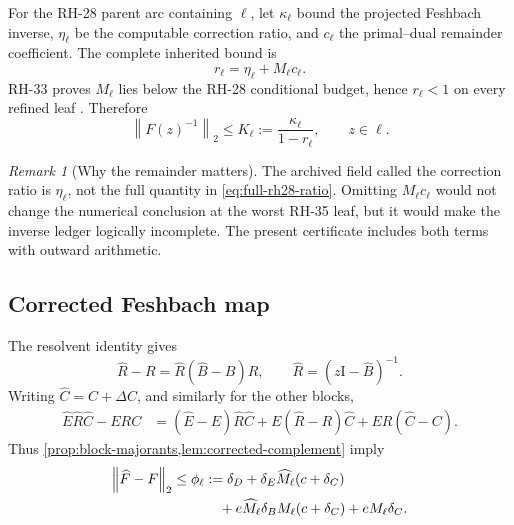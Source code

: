 \documentclass[11pt]{article}
\theoremstyle{definition}
\theoremstyle{remark}
\newtheorem{remark}[theorem]{Remark}
\newcommand{\Id}{\mathrm I}
\newcommand{\norm}[1]{\left\lVert#1\right\rVert}
\begin{document}
For the RH-28 parent arc containing \(\ell\), let
\(\kappa_\ell\) bound the projected Feshbach inverse,
\(\eta_\ell\) be the computable correction ratio, and \(c_\ell\) the
primal--dual remainder coefficient.  The complete inherited bound is
\begin{equation}
 r_\ell=\eta_\ell+M_\ell c_\ell.
 \label{eq:full-rh28-ratio}
\end{equation}
RH-33 proves \(M_\ell\) lies below the RH-28 conditional budget, hence
\(r_\ell<1\) on every refined leaf
\citep{WangArcwise2026,WangAtlas2026}.  Therefore
\begin{equation}
 \norm{F(z)^{-1}}_2
 \leq K_\ell:=
 \frac{\kappa_\ell}{1-r_\ell},
 \qquad z\in\ell.
 \label{eq:stored-f-inverse}
\end{equation}

\begin{remark}[Why the remainder matters]
\label{rem:full-remainder}
The archived field called the correction ratio is \(\eta_\ell\), not the
full quantity in \cref{eq:full-rh28-ratio}.  Omitting
\(M_\ell c_\ell\) would not change the numerical conclusion at the worst
RH-35 leaf, but it would make the inverse ledger logically incomplete.
The present certificate includes both terms with outward arithmetic.
\end{remark}

\subsection{Corrected Feshbach map}

The resolvent identity gives
\begin{equation}
 \widehat R-R
 =\widehat R(\widehat B-B)R,
 \qquad
 \widehat R=(z\Id-\widehat B)^{-1}.
 \label{eq:resolvent-difference}
\end{equation}
Writing \(\widehat C=C+\Delta C\), and similarly for the other blocks,
\begin{align}
 \widehat E\widehat R\widehat C-ERC
 &=(\widehat E-E)\widehat R\widehat C
   +E(\widehat R-R)\widehat C
   +ER(\widehat C-C).
 \label{eq:self-energy-difference}
\end{align}
Thus \cref{prop:block-majorants,lem:corrected-complement} imply
\begin{align}
 \norm{\widehat F-F}_2
 \leq\phi_\ell
 &:=
 \delta_D
 +\delta_E\widehat M_\ell(c+\delta_C)
 \notag\\
 &\quad
 +e\widehat M_\ell\delta_BM_\ell(c+\delta_C)
 +eM_\ell\delta_C.
 \label{eq:f-difference-majorant}
\end{align}
\end{document}
